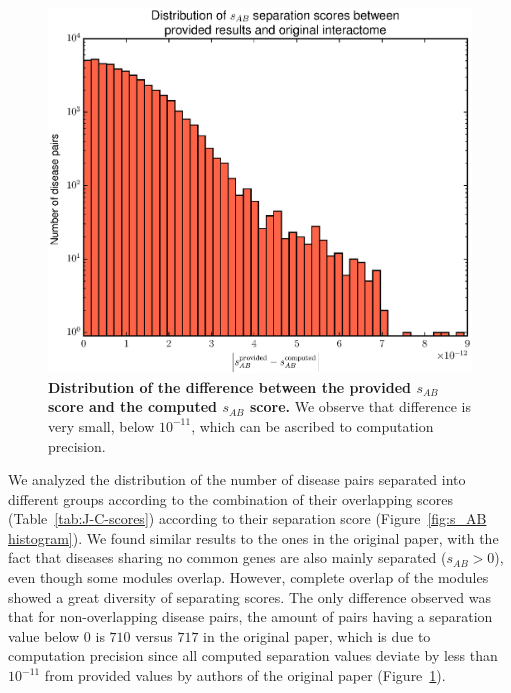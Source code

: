 \documentclass[letterpaper]{article}
\begin{document}
		\begin{figure}[!h]
		\includegraphics[width=.5\textwidth]{images/sep_difference_histogram.eps}
		\vspace{-.5cm}
		\caption{{\bf Distribution of the difference between the provided $s_{AB}$ score and the computed
		$s_{AB}$ score.} We observe that difference is very small, below $10^{-11}$, which can be ascribed
		to computation precision.
		\label{fig:s_AB difference}}
		\end{figure}

		We analyzed the distribution of the number of disease pairs separated into different groups according
		to the combination of their overlapping scores (Table~\ref{tab:J-C-scores}) according to their
		separation score (Figure~\ref{fig:s_AB histogram}). We found similar results to the ones in the
		original paper, with the fact that diseases sharing no common genes are also mainly separated
		($s_{AB} > 0$), even though some modules overlap. However, complete overlap of the modules showed a
		great diversity of separating scores. The only difference observed was that for non-overlapping
		disease pairs, the amount of pairs having a separation value below 0 is $710$ versus $717$ in the
		original paper, which is due to computation precision since all computed separation values deviate
		by less than $10^{-11}$ from provided values by authors of the original paper
		(Figure~\ref{fig:s_AB difference}).
\end{document}
